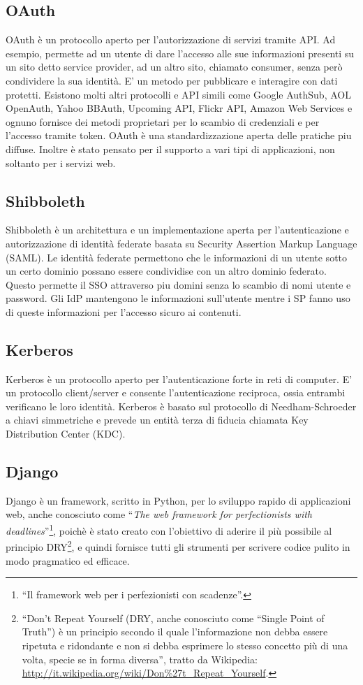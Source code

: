 \subsection{OAuth}
OAuth è un protocollo aperto per l'autorizzazione di servizi tramite
API. Ad esempio, permette ad un utente di dare l'accesso alle sue
informazioni presenti su un sito detto service provider, ad un altro
sito, chiamato consumer, senza però condividere la sua identità. E' un
metodo per pubblicare e interagire con dati protetti. Esistono molti
altri protocolli e API simili come Google AuthSub, AOL OpenAuth, Yahoo
BBAuth, Upcoming API, Flickr API, Amazon Web Services e ognuno
fornisce dei metodi proprietari per lo scambio di credenziali e per
l'accesso tramite token. OAuth è una standardizzazione aperta delle
pratiche piu diffuse. Inoltre è stato pensato per il supporto a vari
tipi di applicazioni, non soltanto per i servizi web.


\subsection{Shibboleth}
Shibboleth è un architettura e un implementazione aperta per
l'autenticazione e autorizzazione di identità federate basata su
Security Assertion Markup Language (SAML). Le identità federate
permettono che le informazioni di un utente sotto un certo dominio
possano essere condividise con un altro dominio federato. Questo
permette il SSO attraverso piu domini senza lo scambio di nomi utente
e password. Gli IdP mantengono le informazioni sull'utente mentre i SP
fanno uso di queste informazioni per l'accesso sicuro ai contenuti.

\subsection{Kerberos}
Kerberos è un protocollo aperto per l'autenticazione forte in reti di
computer. E' un protocollo client/server e consente l'autenticazione
reciproca, ossia entrambi verificano le loro identità. Kerberos è
basato sul protocollo di Needham-Schroeder a chiavi simmetriche e
prevede un entità terza di fiducia chiamata Key Distribution Center
(KDC).

\subsection{Django}\label{Django}
Django è un framework, scritto in Python, per lo sviluppo rapido di
applicazioni web, anche conosciuto come ``\emph{The web framework for
  perfectionists with deadlines}''\footnote{``Il framework web per i
  perfezionisti con scadenze''.}, poichè è stato creato con l'obiettivo
di aderire il più possibile al principio DRY\footnote{``Don't Repeat
  Yourself (DRY, anche conosciuto come ``Single Point of Truth'') è un
  principio secondo il quale l'informazione non debba essere ripetuta
  e ridondante e non si debba esprimere lo stesso concetto più di una
  volta, specie se in forma diversa'', tratto da Wikipedia:
  \url{http://it.wikipedia.org/wiki/Don\%27t_Repeat_Yourself}.}, e
quindi fornisce tutti gli strumenti per scrivere codice pulito in modo
pragmatico ed efficace.

